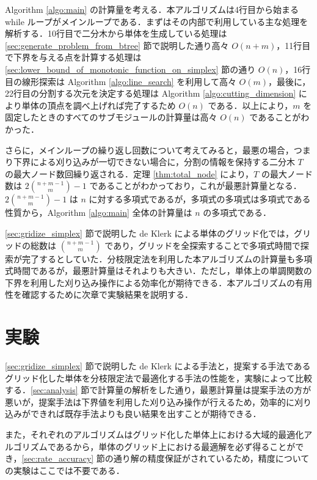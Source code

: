 \documentclass[a4paper,11pt]{jreport}
\begin{document}
Algorithm \ref{algo:main} の計算量を考える．本アルゴリズムは4行目から始まる while ループがメインループである．まずはその内部で利用している主な処理を解析する．10行目で二分木から単体を生成している処理は \ref{sec:generate_problem_from_btree} 節で説明した通り高々 $ O(n + m) $，11行目で下界を与える点を計算する処理は \ref{sec:lower_bound_of_monotonic_function_on_simplex} 節の通り $ O(n) $，16行目の線形探索は Algorithm \ref{algo:line_search} を利用して高々 $ O(m) $，最後に，22行目の分割する次元を決定する処理は Algorithm \ref{algo:cutting_dimension} により単体の頂点を調べ上げれば完了するため $ O(n) $ である．以上により，$ m $ を固定したときのすべてのサブモジュールの計算量は高々 $ O(n) $ であることがわかった．\par
さらに，メインループの繰り返し回数について考えてみると，最悪の場合，つまり下界による刈り込みが一切できない場合に，分割の情報を保持する二分木 $ T $ の最大ノード数回繰り返される．定理 \ref{thm:total_node} により，$ T $ の最大ノード数は $ 2 \binom{n + m - 1}{m} - 1 $ であることがわかっており，これが最悪計算量となる．$ 2 \binom{n + m - 1}{m} - 1 $ は $ n $ に対する多項式であるが，多項式の多項式は多項式である性質から，Algorithm \ref{algo:main} 全体の計算量は $ n $ の多項式である．\par
\ref{sec:gridize_simplex} 節で説明した de Klerk による単体のグリッド化では，グリッドの総数は $ \binom{n + m - 1}{m} $ であり，グリッドを全探索することで多項式時間で探索が完了するとしていた．分枝限定法を利用した本アルゴリズムの計算量も多項式時間であるが，最悪計算量はそれよりも大きい．ただし，単体上の単調関数の下界を利用した刈り込み操作による効率化が期待できる．本アルゴリズムの有用性を確認するために次章で実験結果を説明する．

\chapter{実験}

\ref{sec:gridize_simplex} 節で説明した de Klerk による手法と，提案する手法であるグリッド化した単体を分枝限定法で最適化する手法の性能を，実験によって比較する．\ref{sec:analysis} 節で計算量の解析をした通り，最悪計算量は提案手法の方が悪いが，提案手法は下界値を利用した刈り込み操作が行えるため，効率的に刈り込みができれば既存手法よりも良い結果を出すことが期待できる．\par
また，それぞれのアルゴリズムはグリッド化した単体上における大域的最適化アルゴリズムであるから，単体のグリッド上における最適解を必ず得ることができ，\ref{sec:rate_accuracy} 節の通り解の精度保証がされているため，精度についての実験はここでは不要である．\par
\end{document}
